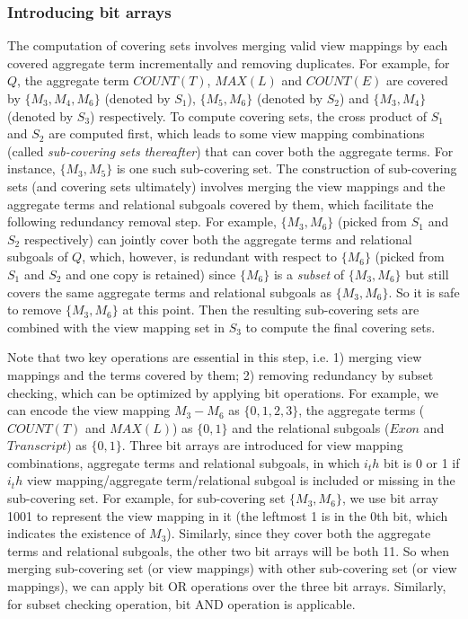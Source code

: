 \begin{example}
\subsubsection{Introducing bit arrays}
The computation of covering sets involves merging valid view mappings by each covered aggregate term incrementally and removing duplicates. For example, for $Q$, the aggregate term $COUNT(T)$, $MAX(L)$ and $COUNT(E)$ are covered by $\{M_3, M_4, M_6\}$ (denoted by $S_1$), $\{M_5, M_6\}$ (denoted by $S_2$) and $\{M_3, M_4\}$ (denoted by $S_3$) respectively. To compute covering sets, the cross product of $S_1$ and $S_2$ are computed first, which leads to some view mapping combinations (called {\em sub-covering sets thereafter}) that can cover both the aggregate terms. For instance, $\{M_3, M_5\}$ is one such sub-covering set. The construction of sub-covering sets (and covering sets ultimately) involves merging the view mappings and the aggregate terms and relational subgoals covered by them, which facilitate the following redundancy removal step. For example, $\{M_3,M_6\}$ (picked from $S_1$ and $S_2$ respectively) can jointly cover both the aggregate terms and relational subgoals of $Q$, which, however, is redundant with respect to $\{M_6\}$ (picked from $S_1$ and $S_2$ and one copy is retained) since $\{M_6\}$ is a {\em subset} of $\{M_3,M_6\}$ but still covers the same aggregate terms and relational subgoals as $\{M_3,M_6\}$. So it is safe to remove $\{M_3, M_6\}$ at this point. Then the resulting sub-covering sets are combined with the view mapping set in $S_3$ to compute the final covering sets.

Note that two key operations are essential in this step, i.e. 1) merging view mappings and the terms covered by them; 2) removing redundancy by subset checking, which can be optimized by applying bit operations. For example, we can encode the view mapping $M_3-M_6$ as $\{0,1,2,3\}$, the aggregate terms ($COUNT(T)$ and $MAX(L)$) as $\{0, 1\}$ and the relational subgoals ($Exon$ and $Transcript$) as $\{0, 1\}$. Three bit arrays are introduced for view mapping combinations, aggregate terms and relational subgoals, in which $i_th$ bit is 0 or 1 if $i_th$ view mapping/aggregate term/relational subgoal is included or missing in the sub-covering set. For example, for sub-covering set $\{M_3, M_6\}$, we use bit array 1001 to represent the view mapping in it (the leftmost 1 is in the 0th bit, which indicates the existence of $M_3$). Similarly, since they cover both the aggregate terms and relational subgoals, the other two bit arrays will be both 11. So when merging sub-covering set (or view mappings) with other sub-covering set (or view mappings), we can apply bit OR operations over the three bit arrays. Similarly, for subset checking operation, bit AND operation is applicable.




\end{example}
